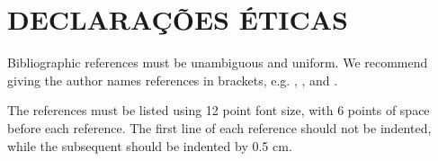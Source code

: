 \documentclass[12pt]{article}
\begin{document}
\section{DECLARAÇÕES ÉTICAS}

Bibliographic references must be unambiguous and uniform.  We recommend giving
the author names references in brackets, e.g. \cite{knuth:84},
\cite{boulic:91}, and \cite{smith:99}.

The references must be listed using 12 point font size, with 6 points of space
before each reference. The first line of each reference should not be
indented, while the subsequent should be indented by 0.5 cm.



\end{document}
